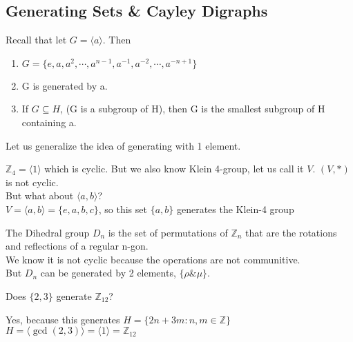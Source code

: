 \subsection{Generating Sets \& Cayley Digraphs}

\begin{prev}
    Recall that let $G = \langle a \rangle$. Then 
    \begin{enumerate}
        \item $G = \{e, a, a^2, \cdots, a^{n-1}, a^{-1}, a^{-2}, \cdots, a^{-n+1}\}$
        \item G is generated by a.
        \item If $G \subseteq H$, (G is a subgroup of H), then G is the smallest subgroup of H containing a. 
    \end{enumerate}
\end{prev}

\newpage
Let us generalize the idea of generating with 1 element. 
\begin{eg}
    $\mathbb{Z}_4 = \langle 1 \rangle$ which is cyclic.
    But we also know Klein 4-group, let us call it $V$. $(V, \ast)$ is not cyclic.\\
    But what about $\langle a, b \rangle$?\\
    $V = \langle a, b \rangle = \{e, a, b, c\}$, so this set $\{a, b\}$ generates the Klein-4 group\\
\end{eg}


\begin{eg}
    The Dihedral group $D_n$ is the set of permutations of $\mathbb{Z}_n$ that are the rotations and reflections of a regular n-gon.\\
    We know it is not cyclic because the operations are not communitive.\\
    But $D_n$ can be generated by 2 elements, $\{\rho \& \mu\}$.\\
\end{eg}

\begin{exercise}
    Does $\{2, 3\}$ generate $\mathbb{Z}_12$?\\
\end{exercise}
\begin{answer}
    Yes, because this generates $H = \{2n + 3m : n, m \in \mathbb{Z}\}$\\
    $H = \langle \gcd(2, 3) \rangle = \langle 1 \rangle = \mathbb{Z}_{12}$\\
\end{answer}